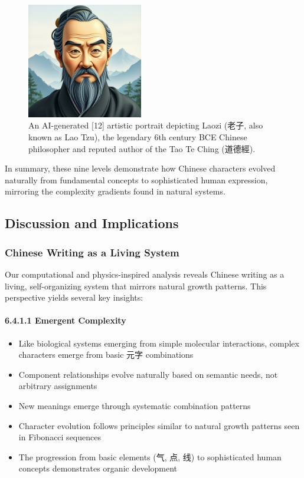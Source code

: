 \documentclass[11pt,letterpaper]{article}
\begin{document}
\begin{figure}
\centering
\includegraphics[width=0.45\textwidth]{./images/laozi-qwen-max.png}
\caption{An AI-generated {[}12{]} artistic portrait depicting Laozi
(老子, also known as Lao Tzu), the legendary 6th century BCE Chinese
philosopher and reputed author of the Tao Te Ching (道德經).}
\end{figure}

In summary, these nine levels demonstrate how Chinese characters evolved naturally
from fundamental concepts to sophisticated human expression, mirroring
the complexity gradients found in natural systems.

\subsection{Discussion and
Implications}\label{discussion-and-implications}

\subsubsection{Chinese Writing as a Living System}\label{chinese-writing-as-a-living-system}

Our computational and physics-inspired analysis reveals Chinese writing
as a living, self-organizing system that mirrors natural growth
patterns. This perspective yields several key insights:

\paragraph{6.4.1.1 Emergent Complexity}\label{emergent-complexity}

\begin{itemize}
\tightlist
\item
  Like biological systems emerging from simple molecular interactions,
  complex characters emerge from basic 元字 combinations
\item
  Component relationships evolve naturally based on semantic needs, not
  arbitrary assignments
\item
  New meanings emerge through systematic combination patterns
\item
  Character evolution follows principles similar to natural growth
  patterns seen in Fibonacci sequences
\item
  The progression from basic elements (气, 点, 线) to sophisticated
  human concepts demonstrates organic development
\end{itemize}
\end{document}
